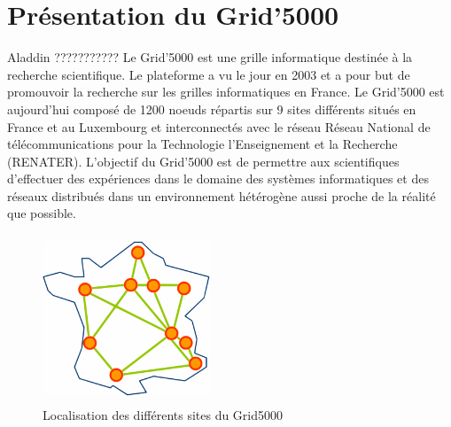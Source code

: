 \documentclass[a4paper, 10pt, onecolumn]{report}
\begin{document}
	\section{Présentation du Grid'5000}
	Aladdin ???????????
Le Grid'5000 est une grille informatique destinée à la recherche scientifique. Le plateforme a vu le jour en 2003 et a pour but de promouvoir la recherche sur les grilles informatiques en France. Le Grid'5000 est aujourd'hui composé de 1200 noeuds répartis sur 9 sites différents situés en France et au Luxembourg et interconnectés avec le réseau Réseau National de télécommunications pour la Technologie l'Enseignement et la Recherche (RENATER). L'objectif du Grid'5000 est de permettre aux scientifiques d'effectuer des expériences dans le domaine des systèmes informatiques et des réseaux distribués dans un environnement hétérogène aussi proche de la réalité que possible.

	\begin{figure}[!h]
		\centering
   		\includegraphics[width=5cm,height=5cm]{map.png}
   		\caption{Localisation des différents sites du Grid5000}
    	\label{fig:map}
	\end{figure} 
\end{document}
